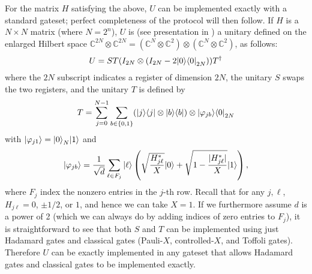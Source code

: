 \documentclass[11pt]{article}
\theoremstyle{definition}
\theoremstyle{remark}
\begin{document}
For the matrix $H$ satisfying the above, $U$ can be implemented exactly with a standard gateset; perfect completeness of the protocol will then follow. If $H$ is a $N \times N$ matrix (where $N=2^n$), $U$ is (see presentation in \cite[Section~3.1~and~Lemma~10]{berry15}) a unitary defined on the enlarged Hilbert space $\mathbb{C}^{2N} \otimes \mathbb{C}^{2N} = (\mathbb{C}^{N} \otimes \mathbb{C}^2) \otimes  (\mathbb{C}^{N} \otimes \mathbb{C}^2)$, as follows:
\begin{equation}
U = ST(I_{2N} \otimes (I_{2N} - 2{\left\vert{0}\right\rangle}{\left\langle{0}\right\vert}_{2N})) T^\dagger
\end{equation}
where the $2N$ subscript indicates a register of dimension $2N$, the unitary $S$ swaps the two registers, and the unitary $T$ is defined by
\begin{equation}
T = \sum_{j=0}^{N-1}\sum_{b \in \{0,1\}} ({\left\vert{j}\right\rangle}{\left\langle{j}\right\vert} \otimes {\left\vert{b}\right\rangle}{\left\langle{b}\right\vert}) \otimes {\left\vert{\varphi_{jb}}\right\rangle}{\left\langle{0}\right\vert}_{2N}
\end{equation}
with ${\left\vert{\varphi_{j1}}\right\rangle} = {\left\vert{0}\right\rangle}_N{\left\vert{1}\right\rangle}$ and
\begin{equation}
{\left\vert{\varphi_{jb}}\right\rangle} = \frac{1}{\sqrt{d}} \sum_{\ell \in F_j} {\left\vert{\ell}\right\rangle}\left(\sqrt{\frac{H^*_{j\ell}}{X}}{\left\vert{0}\right\rangle} + \sqrt{1-\frac{|H^*_{j\ell}|}{X}}{\left\vert{1}\right\rangle}\right),
\end{equation}
where $F_j$ index the nonzero entries in the $j$-th row. Recall that for any $j,\ell$, $H_{j\ell}=0$, $\pm 1/2$, or $1$, and hence we can take $X=1$. If we furthermore assume $d$ is a power of 2 (which we can always do by adding indices of zero entries to $F_j$), it is straightforward to see that both $S$ and $T$ can be implemented using just Hadamard gates and classical gates (Pauli-$X$, controlled-$X$, and Toffoli gates). Therefore $U$ can be exactly implemented in any gateset that allows Hadamard gates and classical gates to be implemented exactly.
\end{document}

